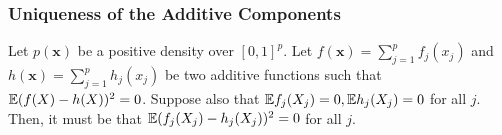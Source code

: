 \documentclass[12pt,pdftex,aos,noinfoline,addressasfootnote]{imsart}
\begin{document}



\subsubsection{Uniqueness of the Additive Components}
 
\begin{lemma}
\label{lem:additive_uniqueness}
Let $p(\mathbf{x})$ be a positive density over $[0,1]^p$. Let $f(\mathbf{x}) = \sum_{j=1}^p f_j(x_j)$ and $h(\mathbf{x}) = \sum_{j=1}^p h_j(x_j)$ be two additive functions such that ${\mathbb E}( f(X) - h(X) )^2 = 0$. Suppose also that ${\mathbb E} f_j(X_j) = 0, {\mathbb E} h_j(X_j) = 0$ for all $j$. Then, it must be that ${\mathbb E}( f_j(X_j) - h_j(X_j))^2 = 0$ for all $j$.
\end{lemma}
\end{document}
